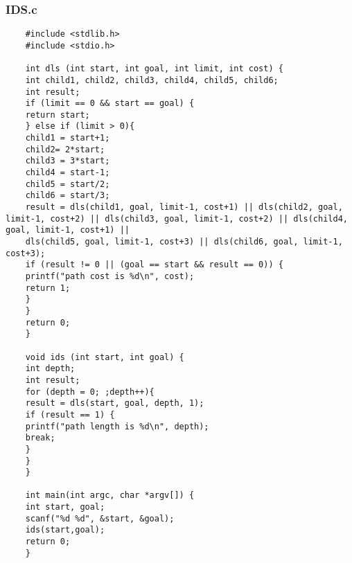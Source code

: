 \documentclass{article}
\begin{document}
	\subsubsection*{IDS.c}
	\begin{lstlisting}
	#include <stdlib.h>
	#include <stdio.h>
	
	int dls (int start, int goal, int limit, int cost) {
	int child1, child2, child3, child4, child5, child6;
	int result;
	if (limit == 0 && start == goal) {
	return start;
	} else if (limit > 0){
	child1 = start+1;
	child2= 2*start;
	child3 = 3*start;
	child4 = start-1;
	child5 = start/2;
	child6 = start/3;
	result = dls(child1, goal, limit-1, cost+1) || dls(child2, goal, limit-1, cost+2) || dls(child3, goal, limit-1, cost+2) || dls(child4, goal, limit-1, cost+1) ||
	dls(child5, goal, limit-1, cost+3) || dls(child6, goal, limit-1, cost+3);
	if (result != 0 || (goal == start && result == 0)) {
	printf("path cost is %d\n", cost);
	return 1;
	}
	}
	return 0;
	}
	
	void ids (int start, int goal) {
	int depth;
	int result;
	for (depth = 0; ;depth++){
	result = dls(start, goal, depth, 1);
	if (result == 1) {
	printf("path length is %d\n", depth);
	break;
	}
	}
	}
	
	int main(int argc, char *argv[]) {
	int start, goal;
	scanf("%d %d", &start, &goal);
	ids(start,goal);
	return 0;
	}
	
	\end{lstlisting}
	
\end{document}
